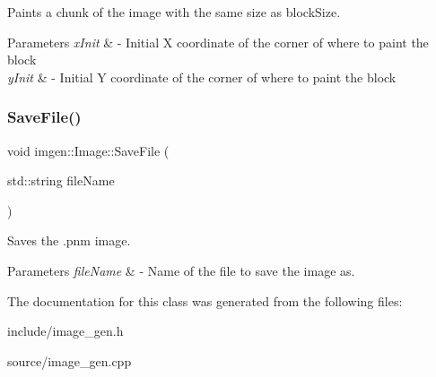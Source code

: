 Paints a chunk of the image with the same size as block\+Size. 


\begin{DoxyParams}{Parameters}
{\em x\+Init} & -\/ Initial X coordinate of the corner of where to paint the block \\
\hline
{\em y\+Init} & -\/ Initial Y coordinate of the corner of where to paint the block \\
\hline
\end{DoxyParams}
\mbox{\label{classimgen_1_1Image_a7da7330a2fadfa0cac8a52202826b89b}} 
\subsubsection{\texorpdfstring{Save\+File()}{SaveFile()}}
{\footnotesize\ttfamily void imgen\+::\+Image\+::\+Save\+File (\begin{DoxyParamCaption}\item[{std\+::string}]{file\+Name }\end{DoxyParamCaption})}



Saves the .pnm image. 


\begin{DoxyParams}{Parameters}
{\em file\+Name} & -\/ Name of the file to save the image as. \\
\hline
\end{DoxyParams}


The documentation for this class was generated from the following files\+:\begin{DoxyCompactItemize}
\item 
include/image\+\_\+gen.\+h\item 
source/image\+\_\+gen.\+cpp\end{DoxyCompactItemize}
